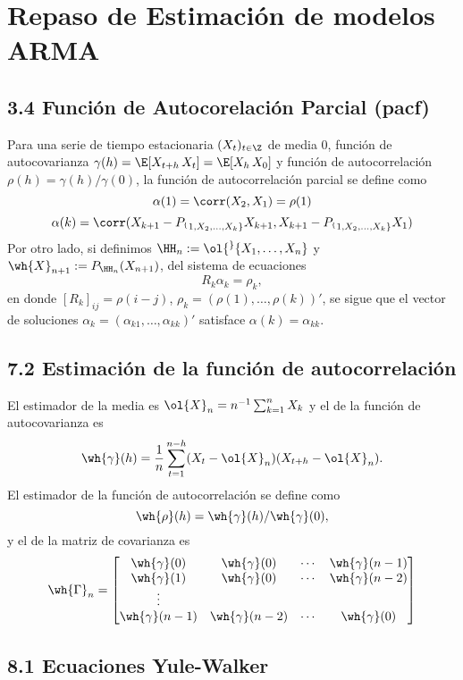 
\section{Repaso de Estimación de modelos ARMA}

\subsection*{3.4 Función de Autocorelación Parcial (pacf)}

Para una serie de tiempo estacionaria $(X_t)_{t \in \Z}$ de media $0$, función de autocovarianza $\gamma(h) = \E[X_{t+h}\, X_{t}] = \E[X_{h}\, X_{0}]$ y función de autocorrelación $\rho(h) = \gamma(h)/\gamma(0)$, la función de autocorrelación parcial se define como
\[ \alpha(1) = \corr(X_2, X_1) = \rho(1) \]
\[ \alpha(k) = \corr(X_{k+1} - P_{\sp\{1,X_2,\ldots,X_k\}}X_{k+1}, X_{k+1} - P_{\sp\{1,X_2,\ldots,X_k\}}X_{1}) \]
Por otro lado, si definimos $\HH_n := \ol{\sp}\{X_1,\ldots,X_n\}$ y $\wh{X}_{n+1} := P_{\HH_n}(X_{n+1})$, del sistema de ecuaciones
\[ R_k \alpha_k = \rho_k, \]
en donde $[R_k]_{ij} = \rho(i-j)$, $\rho_k = (\rho(1),\ldots, \rho(k))'$, se sigue que el vector de soluciones $\alpha_k = (\alpha_{k1},\ldots, \alpha_{kk})'$ satisface $\alpha(k) = \alpha_{kk}$.

\subsection*{7.2 Estimación de la función de autocorrelación}
El estimador de la media es $\ol{X}_n = n^{-1}\sum_{k = 1}^n X_k$ y el de la función de autocovarianza es
\[ \wh{\gamma}(h) = \frac{1}{n} \sum_{t = 1}^{n-h} (X_t - \ol{X}_n)(X_{t+h}-\ol{X}_n).\]
El estimador de la función de autocorrelación se define como
\[ \wh{\rho}(h) = \wh{\gamma}(h)/\wh{\gamma}(0), \]
y el de la matriz de covarianza es
\[ \wh{\Gamma}_n = \left[ \begin{matrix}
    \wh{\gamma}(0) & \wh{\gamma}(0) & \cdots & \wh{\gamma}(n-1)\\
    \wh{\gamma}(1) & \wh{\gamma}(0) & \cdots & \wh{\gamma}(n-2)\\
    \vdots\\
    \wh{\gamma}(n-1) & \wh{\gamma}(n-2) & \cdots & \wh{\gamma}(0)\\
\end{matrix} \right] \]

\subsection*{8.1 Ecuaciones Yule-Walker}

